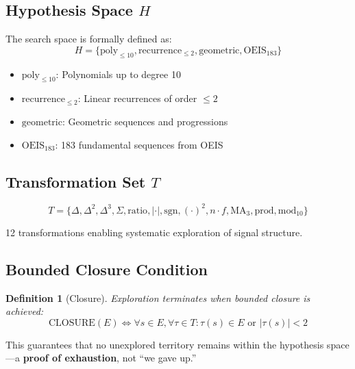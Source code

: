 \documentclass[11pt,a4paper]{article}
\newtheorem{definition}{Definition}
\begin{document}
\subsection{Hypothesis Space $H$}

The search space is formally defined as:
\begin{equation}
H = \{\text{poly}_{\leq 10}, \text{recurrence}_{\leq 2}, \text{geometric}, 
\text{OEIS}_{183}\}
\end{equation}

\begin{itemize}
    \item $\text{poly}_{\leq 10}$: Polynomials up to degree 10
    \item $\text{recurrence}_{\leq 2}$: Linear recurrences of order $\leq 2$
    \item $\text{geometric}$: Geometric sequences and progressions
    \item $\text{OEIS}_{183}$: 183 fundamental sequences from OEIS
\end{itemize}

\subsection{Transformation Set $T$}

\begin{equation}
T = \{\Delta, \Delta^2, \Delta^3, \Sigma, \text{ratio}, |\cdot|, \text{sgn}, 
(\cdot)^2, n \cdot f, \text{MA}_3, \text{prod}, \text{mod}_{10}\}
\end{equation}

12 transformations enabling systematic exploration of signal structure.

\subsection{Bounded Closure Condition}

\begin{definition}[Closure]
Exploration terminates when bounded closure is achieved:
\begin{equation}
\text{CLOSURE}(E) \Leftrightarrow \forall s \in E, \forall \tau \in T: 
\tau(s) \in E \text{ or } |\tau(s)| < 2
\end{equation}
\end{definition}

This guarantees that no unexplored territory remains within the hypothesis 
space---a \textbf{proof of exhaustion}, not ``we gave up.''
\end{document}
